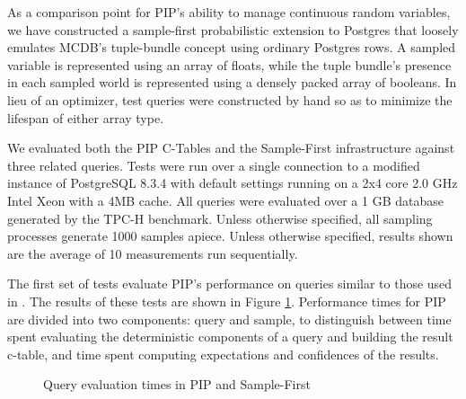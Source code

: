 As a comparison point for PIP's ability to manage continuous random variables, we have constructed a sample-first probabilistic extension to Postgres that loosely emulates MCDB's tuple-bundle concept using ordinary Postgres rows.  A sampled variable is represented using an array of floats, while the tuple bundle's presence in each sampled world is represented using a densely packed array of booleans.  In lieu of an optimizer, test queries were constructed by hand so as to minimize the lifespan of either array type.

We evaluated both the PIP C-Tables and the Sample-First infrastructure against three related queries.  Tests were run over a single connection to a modified instance of PostgreSQL 8.3.4 with default settings running on a 2x4 core 2.0 GHz Intel Xeon with a 4MB cache.  All queries were evaluated over a 1 GB database generated by the TPC-H benchmark.  Unless otherwise specified, all sampling processes generate 1000 samples apiece.  Unless otherwise specified, results shown are the average of 10 measurements run sequentially.  

The first set of tests evaluate PIP's performance on queries similar to those used in \cite{MCDB}.  The results of these tests are shown in Figure \ref{fig:querytimings}.  Performance times for PIP are divided into two components: query and sample, to distinguish between time spent evaluating the deterministic components of a query and building the result c-table, and time spent computing expectations and confidences of the results.

\begin{figure}
\begin{center}
\caption{Query evaluation times in PIP and Sample-First}
\label{fig:querytimings}
\end{center}
\end{figure}

